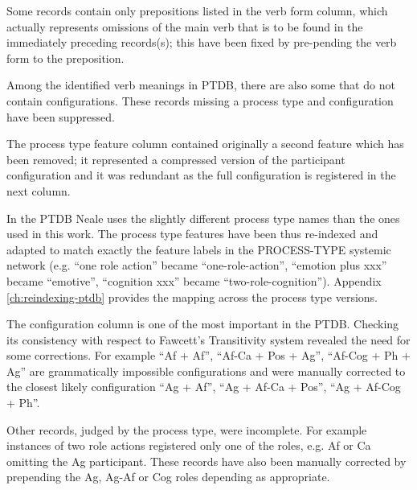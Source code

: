     Some records contain only prepositions listed in the verb form column, which actually represents omissions of the main verb that is to be found in the immediately preceding records(s); this have been fixed by pre-pending the verb form to the preposition. 


    Among the identified verb meanings in PTDB, there are also some that do not contain configurations. These records missing a process type and configuration have been suppressed. 

    The process type feature column contained originally a second feature which has been removed; it represented a compressed version of the participant configuration and it was redundant as the full configuration is registered in the next column. 

    In the PTDB Neale uses the slightly different process type names than the ones used in this work. The process type features have been thus re-indexed and adapted to match exactly the feature labels in the PROCESS-TYPE systemic network (e.g. ``one role action'' became ``one-role-action'', ``emotion plus xxx'' became ``emotive'', ``cognition xxx'' became ``two-role-cognition''). Appendix \ref{ch:reindexing-ptdb} provides the mapping across the process type versions. 

    The configuration column is one of the most important in the PTDB. Checking its consistency with respect to Fawcett's Transitivity system revealed the need for some corrections. For example ``Af + Af'', ``Af-Ca + Pos + Ag'', ``Af-Cog + Ph + Ag'' are grammatically impossible configurations and were manually corrected to the closest likely configuration ``Ag + Af'', ``Ag + Af-Ca + Pos'', ``Ag + Af-Cog + Ph''.

    Other records, judged by the process type, were incomplete. For example instances of two role actions registered only one of the roles, e.g. Af or Ca omitting the Ag participant. These records have also been manually corrected by prepending the Ag, Ag-Af or Cog roles depending as appropriate. 


